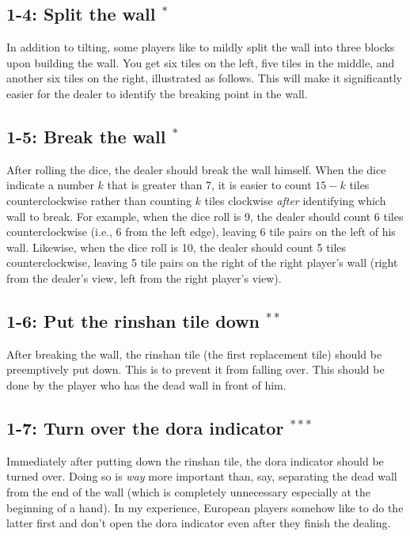 \subsection*{1-4: Split the wall $^{*}$}
In addition to tilting, some players like to mildly split the wall into three blocks upon building the wall. You get six tiles on the left, five tiles in the middle, and another six tiles on the right, illustrated as follows.
\bp
{}
\ep
This will make it significantly easier for the dealer to identify the breaking point in the wall.

\subsection*{1-5: Break the wall $^{*}$}
After rolling the dice, the dealer should break the wall himself. When the dice indicate a number $k$ that is greater than 7, it is easier to count $15-k$ tiles counterclockwise rather than counting $k$ tiles clockwise \emph{after} identifying which wall to break.
For example, when the dice roll is 9, the dealer should count 6 tiles counterclockwise (i.e., 6 from the left edge), leaving 6 tile pairs on the left of his wall. Likewise, when the dice roll is 10, the dealer should count 5 tiles counterclockwise, leaving 5 tile pairs on the right of the right player's wall (right from the dealer's view, left from the right player's view).

\subsection*{1-6: Put the {\jap rinshan} tile down $^{**}$}
After breaking the wall, the {\jap rinshan} tile (the first replacement tile) should be preemptively put down. This is to prevent it from falling over. This should be done by the player who has the dead wall in front of him.

\subsection*{1-7: Turn over the {\jap dora} indicator $^{***}$}
Immediately after putting down the {\jap rinshan} tile, the {\jap dora} indicator should be turned over. Doing so is \emph{way} more important than, say, separating the dead wall from the end of the wall (which is completely unnecessary especially at the beginning of a hand). In my experience, European players somehow like to do the latter first and don't open the {\jap dora} indicator even after they finish the dealing.


